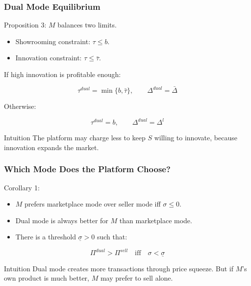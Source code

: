 \documentclass[aspectratio=169,AutoFakeBold,AutoFakeSlant]{beamer}
\begin{document}
\begin{frame}
  \frametitle{Dual Mode Equilibrium}
  \small
  Proposition 3: $M$ balances two limits.

  \begin{itemize}
    \item Showrooming constraint: $\tau\leq b$.
    \item Innovation constraint: $\tau\leq\bar{\tau}$.
  \end{itemize}

  If high innovation is profitable enough:

  \begin{equation*}
    \tau^{dual}=\min\{b,\bar{\tau}\}, \qquad \Delta^{dual}=\bar{\Delta}
  \end{equation*}

  Otherwise:

  \begin{equation*}
    \tau^{dual}=b, \qquad \Delta^{dual}=\Delta^l
  \end{equation*}

  \begin{block}{Intuition}
    The platform may charge less to keep $S$ willing to innovate, because innovation expands the market.
  \end{block}
\end{frame}

\begin{frame}
  \frametitle{Which Mode Does the Platform Choose?}
  \small
  Corollary 1:

  \begin{itemize}
    \item $M$ prefers marketplace mode over seller mode iff $\sigma\leq 0$.
    \item Dual mode is always better for $M$ than marketplace mode.
    \item There is a threshold $\underline{\sigma}>0$ such that:
  \end{itemize}

  \begin{equation*}
    \Pi^{dual}>\Pi^{sell}
    \quad \text{iff} \quad
    \sigma<\underline{\sigma}
  \end{equation*}

  \begin{alertblock}{Intuition}
    Dual mode creates more transactions through price squeeze. But if $M$'s own product is much better, $M$ may prefer to sell alone.
  \end{alertblock}
\end{frame}
\end{document}
